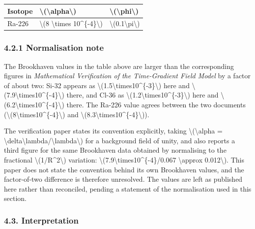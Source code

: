 \documentclass[
  10pt,
]{article}
\begin{document}
\begin{longtable}[]{@{}lll@{}}
\toprule\noalign{}
Isotope & \textbackslash(\textbackslash alpha\textbackslash) &
\textbackslash(\textbackslash phi\textbackslash) \\
\midrule\noalign{}
\endhead
\bottomrule\noalign{}
\endlastfoot
Ra-226 & \textbackslash(8 \textbackslash times
10\^{}\{-4\}\textbackslash) &
\textbackslash(0.1\textbackslash pi\textbackslash) \\
\end{longtable}

\hypertarget{normalisation-note}{%
\subsubsection{4.2.1 Normalisation note}\label{normalisation-note}}

The Brookhaven values in the table above are larger than the
corresponding figures in \emph{Mathematical Verification of the
Time-Gradient Field Model} by a factor of about two: Si-32 appears as
\textbackslash(1.5\textbackslash times10\^{}\{-3\}\textbackslash) here
and \textbackslash(7.9\textbackslash times10\^{}\{-4\}\textbackslash)
there, and Cl-36 as
\textbackslash(1.2\textbackslash times10\^{}\{-3\}\textbackslash) here
and \textbackslash(6.2\textbackslash times10\^{}\{-4\}\textbackslash)
there. The Ra-226 value agrees between the two documents
(\textbackslash(8\textbackslash times10\^{}\{-4\}\textbackslash) and
\textbackslash(8.3\textbackslash times10\^{}\{-4\}\textbackslash)).

The verification paper states its convention explicitly, taking
\textbackslash(\textbackslash alpha =
\textbackslash delta\textbackslash lambda/\textbackslash lambda\textbackslash)
for a background field of unity, and also reports a third figure for the
same Brookhaven data obtained by normalising to the fractional
\textbackslash(1/R\^{}2\textbackslash) variation:
\textbackslash(7.9\textbackslash times10\^{}\{-4\}/0.067
\textbackslash approx 0.012\textbackslash). This paper does not state
the convention behind its own Brookhaven values, and the factor-of-two
difference is therefore unresolved. The values are left as published
here rather than reconciled, pending a statement of the normalisation
used in this section.

\hypertarget{interpretation}{%
\subsubsection{4.3. Interpretation}\label{interpretation}}
\end{document}
